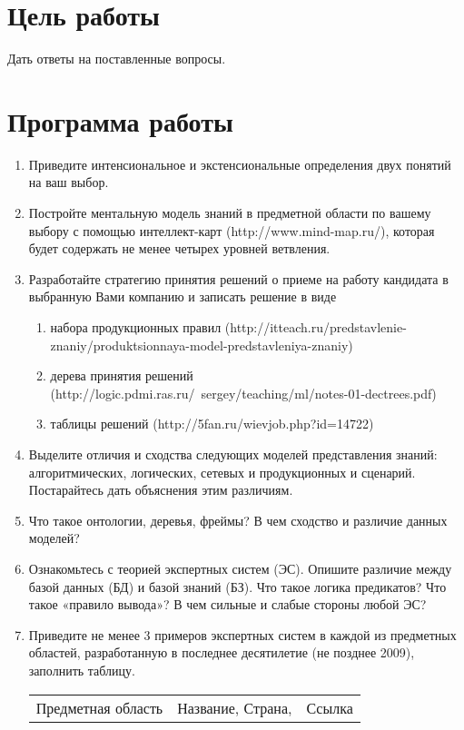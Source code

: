 \documentclass[14pt,a4paper,report]{report}
\begin{document}
\section{Цель работы}

Дать ответы на поставленные вопросы.

\section{Программа работы}

\begin{enumerate}
\item Приведите интенсиональное и экстенсиональные определения двух понятий на ваш выбор.
\item Постройте ментальную модель знаний в предметной области по вашему выбору с помощью
интеллект-карт (http://www.mind-map.ru/), которая будет содержать не менее четырех уровней
ветвления.
\item Разработайте стратегию принятия решений о приеме на работу кандидата в выбранную Вами
компанию и записать решение в виде
\begin{enumerate}
\item набора продукционных правил (http://itteach.ru/predstavlenie-znaniy/produktsionnaya-model-predstavleniya-znaniy)
\item дерева принятия решений (http://logic.pdmi.ras.ru/~sergey/teaching/ml/notes-01-dectrees.pdf)
\item таблицы решений (http://5fan.ru/wievjob.php?id=14722)
\end{enumerate}
\item Выделите отличия и сходства следующих моделей представления знаний: алгоритмических,
логических, сетевых и продукционных и сценарий. Постарайтесь дать объяснения этим различиям.
\item Что такое онтологии, деревья, фреймы? В чем сходство и различие данных моделей?
\item Ознакомьтесь с теорией экспертных систем (ЭС). Опишите различие между базой данных (БД) и
базой знаний (БЗ). Что такое логика предикатов? Что такое «правило вывода»? В чем сильные и
слабые стороны любой ЭС?
\item Приведите не менее 3 примеров экспертных систем в каждой из предметных областей,
разработанную в последнее десятилетие (не позднее 2009), заполнить таблицу.
\begin{center}
    \begin{tabular}{ | l | l | l | }
    \hline
    Предметная область & Название, Страна, & Ссылка \\

\end{tabular}
\end{center}
\end{enumerate}
\end{document}
